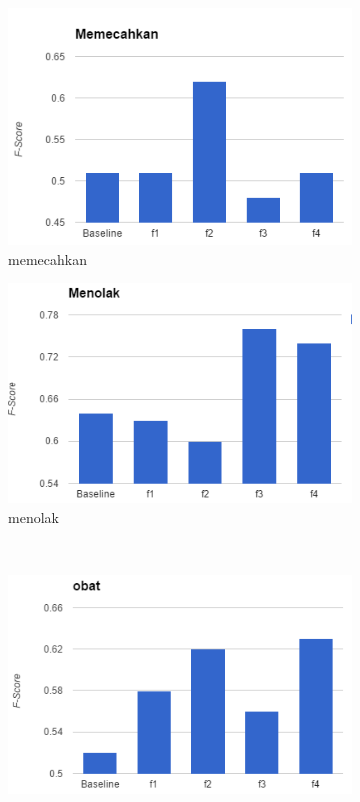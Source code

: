 \begin{figure}[H]
	\begin{subfigure}{.5\textwidth}
		\centering
		\includegraphics[width=1\linewidth]{adit_pics/memecahkan.png}
		\caption{memecahkan}
	\end{subfigure}%
	\begin{subfigure}{.5\textwidth}
		\centering
		\includegraphics[width=1\linewidth]{adit_pics/menolak.png}
		\caption{menolak}
	\end{subfigure}%
	\\
	\begin{subfigure}{.5\textwidth}
		\centering
		\includegraphics[width=1\linewidth]{adit_pics/obat.png}

\end{subfigure}
\end{figure}
